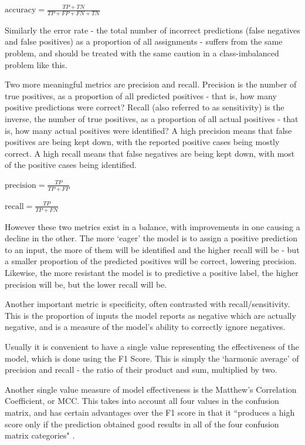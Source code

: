 $\mbox{accuracy} = \frac{TP + TN}{TP + FP + FN + TN}$

Similarly the error rate - the total number of incorrect predictions (false negatives and false positives) as a proportion of all assignments - suffers from the same problem, and should be treated with the same caution in a class-imbalanced problem like this.

Two more meaningful metrics are precision and recall. Precision is the number of true positives, as a proportion of all predicted positives - that is, how many positive predictions were correct? Recall (also referred to as sensitivity) is the inverse, the number of true positives, as a proportion of all actual positives - that is, how many actual positives were identified? A high precision means that false positives are being kept down, with the reported positive cases being mostly correct. A high recall means that false negatives are being kept down, with most of the positive cases being identified.

$\mbox{precision} = \frac{TP}{TP + FP}$

$\mbox{recall} = \frac{TP}{TP + FN}$

However these two metrics exist in a balance, with improvements in one causing a decline in the other. The more `eager' the model is to assign a positive prediction to an input, the more of them will be identified and the higher recall will be - but a smaller proportion of the predicted positives will be correct, lowering precision. Likewise, the more resistant the model is to predictive a positive label, the higher precision will be, but the lower recall will be.

Another important metric is specificity, often contrasted with recall/sensitivity. This is the proportion of inputs the model reports as negative which are actually negative, and is a measure of the model's ability to correctly ignore negatives.

Usually it is convenient to have a single value representing the effectiveness of the model, which is done using the F1 Score. This is simply the `harmonic average' of precision and recall - the ratio of their product and sum, multiplied by two.

Another single value measure of model effectiveness is the Matthew's Correlation Coefficient, or MCC. This takes into account all four values in the confusion matrix, and has certain advantages over the F1 score in that it ``produces a high score only if the prediction obtained good results in all of the four confusion matrix categories" \cite{chicco2020mcc}.

